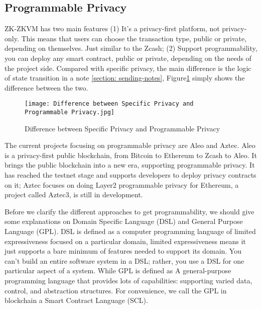 \subsection{Programmable Privacy}

ZK-ZKVM has two main features (1) It's a privacy-first platform, not privacy-only. This means that users can 
choose the transaction type, public or private, depending on themselves. Just similar to the Zcash\cite{website:Zcash}; 
(2) Support programmability, you can deploy any smart contract, public or 
private, depending on the needs of the project side. Compared with specific 
privacy, the main difference is the logic of state transition in a note \ref{section: sending-notes}, Figure\ref{fig:Difference between Specific Privacy and Programmable Privacy} simply shows the difference 
between the two.
\begin{figure}[!ht]
    \centering
    \texttt{[image: Difference between Specific Privacy and Programmable Privacy.jpg]}
    \caption{Difference between Specific Privacy and Programmable Privacy}
    \label{fig:Difference between Specific Privacy and Programmable Privacy}
\end{figure}

The current projects focusing on programmable privacy are Aleo\cite{website:Aleo} and Aztec\cite{website:Aztec}. Aleo\cite{website:Aleo} is a 
privacy-first public blockchain, from Bitcoin\cite{website:BTC} to Ethereum\cite{website:Ethereum} to Zcash\cite{website:Zcash} to Aleo\cite{website:Aleo}. It brings the public blockchain into a new era,
supporting programmable privacy. 
It has reached the testnet stage and supports developers to deploy privacy contracts on it; 
Aztec\cite{website:Aztec} focuses on doing Layer2 programmable privacy for Ethereum\cite{website:Ethereum}, a project 
called Aztec3\cite{website:Aztec3}, is still in development.

Before we clarify the different approaches to get programmability, we should give some explanations on Domain Specific Language (DSL)\cite{website:DSL} and General Purpose Language (GPL)\cite{website:DSL}.
DSL\cite{website:DSL} is defined as a computer programming language of limited expressiveness focused on a particular domain, limited expressiveness means it just supports a bare minimum of features 
needed to support its domain. You can't build an entire software system in a DSL; rather, you use a DSL\cite{website:DSL} for one particular aspect of a system. While GPL\cite{website:DSL} is defined as A general-purpose programming language
that provides lots of capabilities: supporting varied data, control, and abstraction structures. For convenience, we call the GPL in blockchain a Smart Contract Language (SCL).

